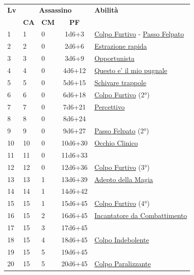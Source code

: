 {\begin{multicols}{2}


\noindent\begin{tabularx}{\linewidth}{p{0.3cm}|p{0.3cm}p{0.3cm}c|X|}
	\toprule
 \rowcolor{gray!20}	\textbf{Lv} & \multicolumn{3}{c|}{\textbf{Assassino}} & \textbf{Abilità} \\
& \centering\arraybackslash \textbf{CA} & \centering\arraybackslash \textbf{CM} & \centering\arraybackslash \textbf{PF} & \\
	\toprule
	1 &1	& 0	&	1d6+3	&\hyperlink{Colpo Furtivo}{Colpo Furtivo} - \hyperlink{Passo Felpato}{Passo Felpato}\\
 \rowcolor{gray!20}2	&	2	& 0	&	2d6+6	&\hyperlink{Estrazione rapida}{Estrazione rapida}\\
	3	&	3	& 0	&	3d6+9	&\hyperlink{Opportunista}{Opportunista}\\
 \rowcolor{gray!20}4	&	4	& 0	&	4d6+12	&\hyperlink{Questo e' il mio pugnale}{Questo e' il mio pugnale}\\
	5	&	5	& 0	&	5d6+15	&\hyperlink{Schivare trappole}{Schivare trappole}\\
 \rowcolor{gray!20}6	&	6	& 0	&	6d6+18	&\hyperlink{Colpo Furtivo}{Colpo Furtivo} (2°)\\
	7	&	7	& 0	&	7d6+21	&\hyperlink{Percettivo}{Percettivo}\\
 \rowcolor{gray!20}8	&	8	& 0	&	8d6+24	&\\
	9	&	9	& 0	&	9d6+27	&\hyperlink{Passo Felpato}{Passo Felpato} (2°)\\
 \rowcolor{gray!20}10	&	10	& 0	&	10d6+30	&\hyperlink{Occhio Clinico}{Occhio Clinico}\\
	11	&	11	& 0	&	11d6+33	&\\
 \rowcolor{gray!20}12	&	12	& 0	&	12d6+36	&\hyperlink{Colpo Furtivo}{Colpo Furtivo} (3°)\\
	13	&	13	& 1	&	13d6+39	&\hyperlink{Adepto della Magia}{Adepto della Magia}\\
 \rowcolor{gray!20}14	&	14	& 1	&	14d6+42	&\\
	15	&	15	& 1	&	15d6+45	&\hyperlink{Colpo Furtivo}{Colpo Furtivo} (4°)\\
 \rowcolor{gray!20}16	&	15	& 2	&	16d6+45	&\hyperlink{Incantatore da Combattimento}{Incantatore da Combattimento}\\
	17	&	15	& 3	&	17d6+45	&\\
 \rowcolor{gray!20}18	&	15	& 4	&	18d6+45	&\hyperlink{Colpo Indebolente}{Colpo Indebolente}\\
	19	&	15	& 5	&	19d6+45	&\\
 \rowcolor{gray!20}20	&	15	& 5	&	20d6+45	&\hyperlink{Colpo Paralizzante}{Colpo Paralizzante}\\
\end{tabularx}


\end{multicols}}
